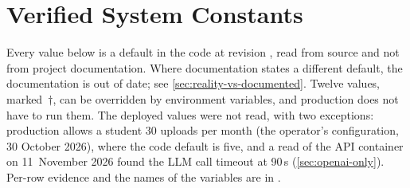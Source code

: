 \chapter{Verified System Constants}
\label{app:constants}

Every value below is a default in the code at revision \thesisCommit{},
read from source and not from project documentation. Where documentation
states a different default, the documentation is out of date; see
\cref{sec:reality-vs-documented}. Twelve values, marked~$\dagger$, can be
overridden by environment variables, and production does not have to run
them. The deployed values were not read, with two exceptions: production
allows a student 30 uploads per month (the operator's configuration, 30
October 2026), where the code default is five, and a read of the API
container on 11~November 2026 found the LLM call timeout at 90\,s
(\cref{sec:openai-only}). Per-row evidence and the
names of the variables are in .

